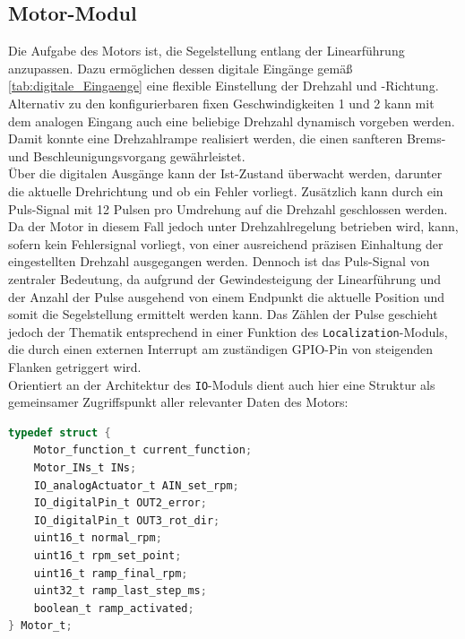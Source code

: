 \subsection{Motor-Modul}
Die Aufgabe des Motors ist, die Segelstellung entlang der Linearführung anzupassen. Dazu ermöglichen dessen digitale Eingänge gemäß \autoref{tab:digitale_Eingaenge} eine flexible Einstellung der Drehzahl und -Richtung. Alternativ zu den konfigurierbaren fixen Geschwindigkeiten 1 und 2 kann mit dem analogen Eingang auch eine beliebige Drehzahl dynamisch vorgeben werden. Damit konnte eine Drehzahlrampe realisiert werden, die einen sanfteren Brems- und Beschleunigungsvorgang gewährleistet.\\

\noindent
Über die digitalen Ausgänge kann der Ist-Zustand überwacht werden, darunter die aktuelle Drehrichtung und ob ein Fehler vorliegt. Zusätzlich kann durch ein Puls-Signal mit 12 Pulsen pro Umdrehung auf die Drehzahl geschlossen werden. Da der Motor in diesem Fall jedoch unter Drehzahlregelung betrieben wird, kann, sofern kein Fehlersignal vorliegt, von einer ausreichend präzisen Einhaltung der eingestellten Drehzahl ausgegangen werden. Dennoch ist das Puls-Signal von zentraler Bedeutung, da aufgrund der Gewindesteigung der Linearführung und der Anzahl der Pulse ausgehend von einem Endpunkt die aktuelle Position und somit die Segelstellung ermittelt werden kann. Das Zählen der Pulse geschieht jedoch der Thematik entsprechend in einer Funktion des \verb|Localization|-Moduls, die durch einen externen Interrupt am zuständigen GPIO-Pin von steigenden Flanken getriggert wird.\\

\noindent
Orientiert an der Architektur des \verb|IO|-Moduls dient auch hier eine Struktur als gemeinsamer Zugriffspunkt aller relevanter Daten des Motors:
\begin{lstlisting}[language=C, caption={Struktur des Motors}, label={lst:motor}]
typedef struct {
	Motor_function_t current_function;
	Motor_INs_t INs;
	IO_analogActuator_t AIN_set_rpm;
	IO_digitalPin_t OUT2_error;
	IO_digitalPin_t OUT3_rot_dir;
	uint16_t normal_rpm;
	uint16_t rpm_set_point;
	uint16_t ramp_final_rpm;
	uint32_t ramp_last_step_ms;
	boolean_t ramp_activated;
} Motor_t;
\end{lstlisting}
